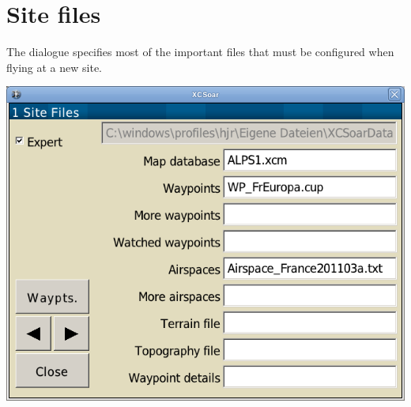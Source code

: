 


\clearpage
\section{Site files}
The dialogue specifies most of the important files that must be
configured when flying at a new site.

\begin{center}
\includegraphics[angle=0,width=0.8\linewidth,keepaspectratio='true']{figures/config-site.png}
\end{center}

